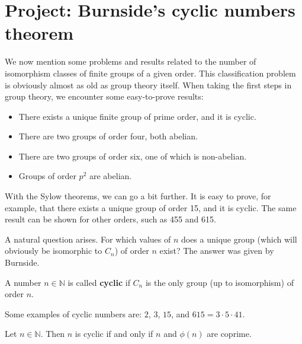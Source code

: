 \section{Project: Burnside's cyclic numbers theorem}

We now mention some problems and results related to the number of isomorphism classes of finite groups of a given order. This classification problem is obviously almost as old as group theory itself. When taking the first steps in group theory, we encounter some easy-to-prove results:
\begin{itemize}
    \item There exists a unique finite group of prime order, and it is cyclic.
    \item There are two groups of order four, both abelian.
    \item There are two groups of order six, one of which is non-abelian.
    \item Groups of order $p^2$ are abelian.
\end{itemize}

With the Sylow theorems, we can go a bit further. It is easy to prove, for example, that there exists a unique group of order 15, and it is cyclic. The same result can be shown for other orders, such as 455 and 615.

A natural question arises. For which values of $n$ does a unique group (which will obviously be isomorphic to $C_n$) of order $n$ exist? The answer was given by Burnside.

\begin{definition}
A number $n\in\mathbb{N}$ is called \textbf{cyclic} if $C_n$ is the only group (up to isomorphism) of order $n$.
\end{definition}

Some examples of cyclic numbers are: $2$, $3$, $15$, and $615=3\cdot 5\cdot 41$.

\begin{theorem}[Burnside]
    Let $n\in\mathbb{N}$. Then $n$ is cyclic if and only if $n$ and $\phi(n)$ are coprime.
\end{theorem}

